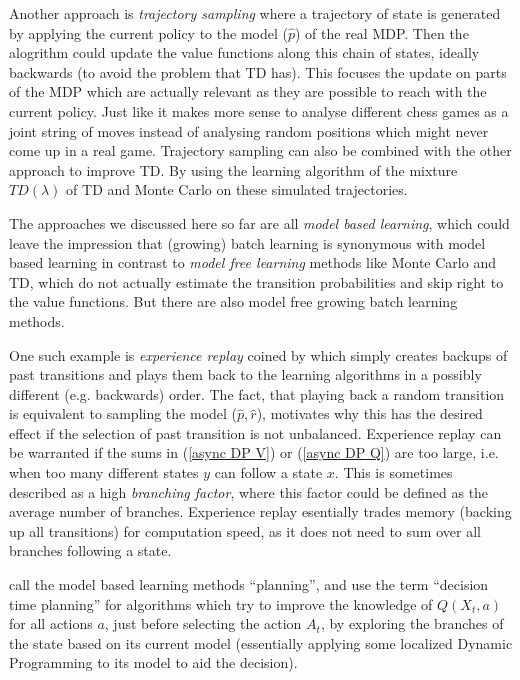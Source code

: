Another approach is \emph{trajectory sampling} where a trajectory of state is generated by applying the current policy to the model (\(\hat{p}\)) of the real MDP. Then the alogrithm could update the value functions along this chain of states, ideally backwards (to avoid the problem that TD has). This focuses the update on parts of the MDP which are actually relevant as they are possible to reach with the current policy. Just like it makes more sense to analyse different chess games as a joint string of moves instead of analysing random positions which might never come up in a real game. Trajectory sampling can also be combined with the other approach to improve TD. By using the learning algorithm of the mixture \(TD(\lambda)\) of TD and Monte Carlo on these simulated trajectories. 

The approaches we discussed here so far are all \emph{model based learning}, which could leave the impression that (growing) batch learning is synonymous with model based learning in contrast to \emph{model free learning} methods like Monte Carlo and TD, which do not actually estimate the transition probabilities and skip right to the value functions. But there are also model free growing batch learning methods. 

One such example is \emph{experience replay} coined by \textcite{linSelfimprovingReactiveAgents1992} which simply creates backups of past transitions and plays them back to the learning algorithms in a possibly different (e.g. backwards) order. The fact, that playing back a random transition is equivalent to sampling the model (\(\hat{p}, \hat{r}\)), motivates why this has the desired effect if the selection of past transition is not unbalanced.  Experience replay can be warranted if the sums in (\ref{async DP V}) or (\ref{async DP Q}) are too large, i.e. when too many different states \(y\) can follow a state \(x\). This is sometimes described as a high \emph{branching factor}, where this factor could be defined as the average number of branches. Experience replay esentially trades memory (backing up all transitions) for computation speed, as it does not need to sum over all branches following a state.

\textcite{suttonReinforcementLearningIntroduction2018a} call the model based learning methods ``planning'', and use the term ``decision time planning'' for algorithms which try to improve the knowledge of \(Q(X_t,a)\) for all actions \(a\), just before selecting the action \(A_t\), by exploring the branches of the state based on its current model (essentially applying some localized Dynamic Programming to its model to aid the decision).



